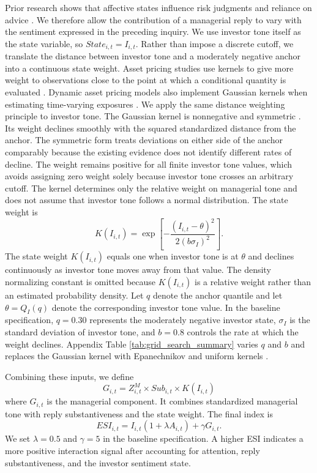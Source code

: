 \documentclass[12pt]{article}
\begin{document}
Prior research shows that affective states influence risk judgments and reliance on advice \citep{gino2012,loewenstein2001risk}. We therefore allow the contribution of a managerial reply to vary with the sentiment expressed in the preceding inquiry. We use investor tone itself as the state variable, so $State_{i,t}=I_{i,t}$. Rather than impose a discrete cutoff, we translate the distance between investor tone and a moderately negative anchor into a continuous state weight. Asset pricing studies use kernels to give more weight to observations close to the point at which a conditional quantity is evaluated \citep{aitsahalia1998,ang2012testing}. Dynamic asset pricing models also implement Gaussian kernels when estimating time-varying exposures \citep{adrian2015regression}. We apply the same distance weighting principle to investor tone. The Gaussian kernel is nonnegative and symmetric \citep{silverman1986density}. Its weight declines smoothly with the squared standardized distance from the anchor. The symmetric form treats deviations on either side of the anchor comparably because the existing evidence does not identify different rates of decline. The weight remains positive for all finite investor tone values, which avoids assigning zero weight solely because investor tone crosses an arbitrary cutoff. The kernel determines only the relative weight on managerial tone and does not assume that investor tone follows a normal distribution. The state weight is
\begin{equation}
K(I_{i,t})=\exp\left[-\frac{(I_{i,t}-\theta)^2}{2(b\sigma_I)^2}\right].
\end{equation}
\noindent The state weight $K(I_{i,t})$ equals one when investor tone is at $\theta$ and declines continuously as investor tone moves away from that value. The density normalizing constant is omitted because $K(I_{i,t})$ is a relative weight rather than an estimated probability density. Let $q$ denote the anchor quantile and let $\theta=Q_I(q)$ denote the corresponding investor tone value. In the baseline specification, $q=0.30$ represents the moderately negative investor state, $\sigma_I$ is the standard deviation of investor tone, and $b=0.8$ controls the rate at which the weight declines. Appendix Table \ref{tab:grid_search_summary} varies $q$ and $b$ and replaces the Gaussian kernel with Epanechnikov and uniform kernels \citep{epanechnikov1969}.

Combining these inputs, we define
\begin{equation}
G_{i,t}=Z^M_{i,t}\times Sub_{i,t}\times K(I_{i,t})
\end{equation}
\noindent where $G_{i,t}$ is the managerial component. It combines standardized managerial tone with reply substantiveness and the state weight.
\noindent The final index is
\begin{equation}
\label{eq:esi}
ESI_{i,t}=I_{i,t}(1+\lambda A_{i,t})+\gamma G_{i,t}.
\end{equation}
\noindent We set $\lambda=0.5$ and $\gamma=5$ in the baseline specification. A higher ESI indicates a more positive interaction signal after accounting for attention, reply substantiveness, and the investor sentiment state.
\end{document}

